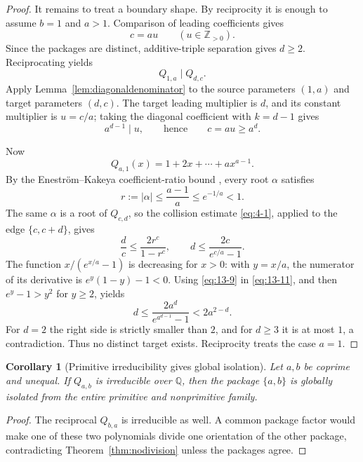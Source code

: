 \documentclass[11pt]{article}
\numberwithin{equation}{section}
\newtheorem{corollary}[theorem]{Corollary}
\theoremstyle{definition}
\newcommand{\Q}{\mathbb Q}
\newcommand{\Z}{\mathbb Z}
\begin{document}
\begin{proof}
It remains to treat a boundary shape.  By reciprocity it is enough to assume
\(b=1\) and \(a>1\).  Comparison of leading coefficients gives
\begin{equation}
 c=au\qquad(u\in\Z_{>0}).
 \label{eq:13-8}
\end{equation}
Since the packages are distinct, additive-triple separation gives \(d\geq2\).
Reciprocating yields
\[
 Q_{1,a}\mid Q_{d,c}.
\]
Apply Lemma~\ref{lem:diagonaldenominator} to the source parameters \((1,a)\)
and target parameters \((d,c)\).  The target leading multiplier is \(d\),
and its constant multiplier is \(u=c/a\); taking the diagonal coefficient
with \(k=d-1\) gives
\begin{equation}
 a^{d-1}\mid u,
 \qquad\text{hence}\qquad c=au\geq a^d.
 \label{eq:13-9}
\end{equation}

Now
\[
 Q_{a,1}(x)=1+2x+\cdots+a x^{a-1}.
\]
By the Enestr\"om--Kakeya coefficient-ratio bound
\cite{AndersonSaffVarga1979}, every root \(\alpha\) satisfies
\begin{equation}
 r:=|\alpha|\leq\frac{a-1}{a}\leq e^{-1/a}<1.
 \label{eq:13-10}
\end{equation}
The same \(\alpha\) is a root of \(Q_{c,d}\), so the collision estimate
\eqref{eq:4-1}, applied to the edge \(\{c,c+d\}\), gives
\[
 \frac dc\leq\frac{2r^c}{1-r^c},
 \qquad
 d\leq\frac{2c}{e^{c/a}-1}.
 \label{eq:13-11}
\]
The function \(x/(e^{x/a}-1)\) is decreasing for \(x>0\): with
\(y=x/a\), the numerator of its derivative is
\(e^y(1-y)-1<0\).  Using \eqref{eq:13-9} in \eqref{eq:13-11}, and then
\(e^y-1>y^2\) for \(y\geq2\), yields
\[
 d\leq\frac{2a^d}{e^{a^{d-1}}-1}<2a^{2-d}.
\]
For \(d=2\) the right side is strictly smaller than \(2\), and for
\(d\geq3\) it is at most \(1\), a contradiction.  Thus no distinct target
exists.  Reciprocity treats the case \(a=1\).
\end{proof}

\begin{corollary}[Primitive irreducibility gives global isolation]
\label{cor:primitiveisolation}
Let \(a,b\) be coprime and unequal.  If \(Q_{a,b}\) is irreducible over
\(\Q\), then the package \(\{a,b\}\) is globally isolated from the entire
primitive and nonprimitive family.
\end{corollary}

\begin{proof}
The reciprocal \(Q_{b,a}\) is irreducible as well.  A common package factor
would make one of these two polynomials divide one orientation of the other
package, contradicting Theorem~\ref{thm:nodivision} unless the packages agree.
\end{proof}
\end{document}
